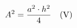 \documentclass[preview]{standalone}
\begin{document}
\begin{align*}
\special{dvisvgm:raw <g id='unique000'>}A^2 = \frac{a^2 \cdot h^2}{4} \quad \text{(V)}\special{dvisvgm:raw </g>}
\end{align*}
\end{document}
